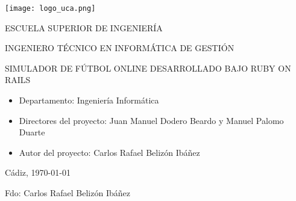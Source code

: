 

\begin{center}

  \texttt{[image: logo\_uca.png]} \\

  \vspace{2.0cm}

  \Large{ESCUELA SUPERIOR DE INGENIERÍA} \\

  \vspace{1.0cm}

  \large{INGENIERO TÉCNICO EN INFORMÁTICA DE GESTIÓN} \\

  \vspace{2.0cm}

  \large{SIMULADOR DE FÚTBOL ONLINE DESARROLLADO BAJO RUBY ON RAILS} \\

  \vspace{1.0cm}

\end{center}

\begin{itemize}
\item \large{Departamento: Ingeniería Informática}
\item \large{Directores del proyecto: Juan Manuel Dodero Beardo y Manuel Palomo Duarte}
\item \large{Autor del proyecto: Carlos Rafael Belizón Ibáñez}
\end{itemize}

\vspace{1.0cm}

\begin{flushright}
  \large{Cádiz, \today} \\

  \vspace{2.5cm}

  \large{Fdo: Carlos Rafael Belizón Ibáñez}
\end{flushright}
